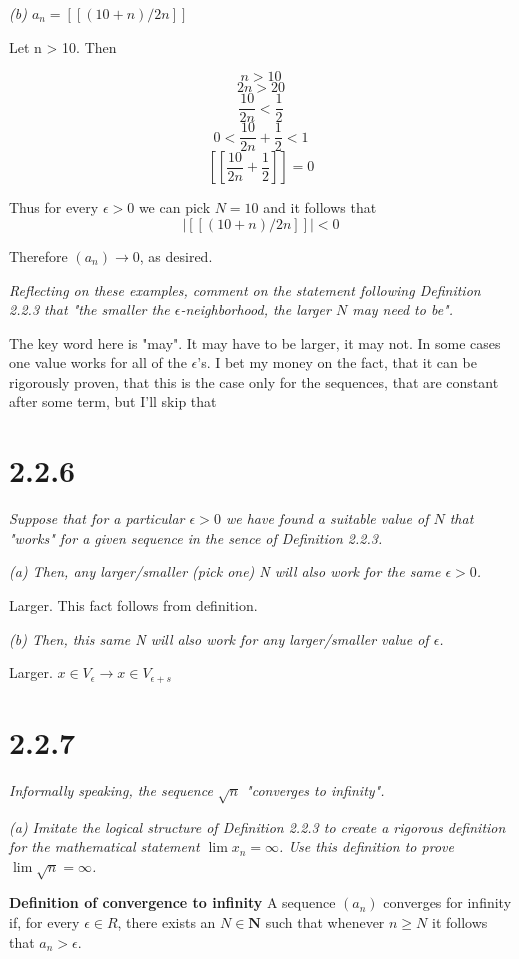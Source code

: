 \documentclass[11pt,oneside,titlepage]{book}
\begin{document}
\textit{(b) $a_n = [[(10 + n)/2n]]$}

Let n > 10. Then

$$n > 10$$
$$2n > 20$$
$$\frac{10}{2n} < \frac{1}{2}$$
$$0 < \frac{10}{2n} + \frac{1}{2} < 1$$
$$[[\frac{10}{2n} + \frac{1}{2} ]] = 0$$

Thus for every $\epsilon > 0$ we can pick $N = 10$ and it follows that 
$$|[[(10 + n)/2n]]| < 0$$

Therefore $(a_n) \to 0$, as desired.

\textit{Reflecting on these examples, comment on the statement following Definition
  2.2.3 that "the smaller the $\epsilon$-neighborhood, the larger $N$ may
  need to be".}

The key word here is "may". It may have to be larger, it may not. In some cases one
value works for all of the $\epsilon$'s. I bet my money on the fact, that it
can be rigorously proven, that this is the case only for the sequences, that are constant after
some term, but I'll skip that

\section*{2.2.6}
\textit{Suppose that for a particular $\epsilon > 0$ we have found a suitable
  value of $N$ that "works" for a given sequence in the sence of Definition 2.2.3.}

\textit{(a) Then, any larger/smaller (pick one) N will also work for the same $\epsilon > 0$.}

Larger. This fact follows from definition.

\textit{(b) Then, this same N will also work for any larger/smaller value of $\epsilon$.}

Larger. $x \in V_\epsilon \to x \in V_{\epsilon + s}$

\section*{2.2.7}
\textit{Informally speaking, the sequence $\sqrt{n}$ "converges to infinity".}

\textit{(a) Imitate the logical structure of Definition 2.2.3 to create a rigorous definition
  for the mathematical statement $\lim x_n = \infty$. Use this definition to prove
  $\lim \sqrt{n} = \infty$.}

\textbf{Definition of convergence to infinity}
A sequence $(a_n)$ converges for infinity if, for every $\epsilon \in R$, there exists an
$N \in \textbf{N}$ such that whenever $n \geq N$ it follows that $a_n > \epsilon$.
\end{document}
